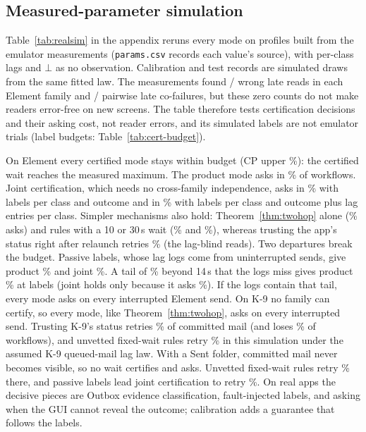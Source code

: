 \subsection{Measured-parameter simulation}
\label{sec:eval-realsim}

Table~\ref{tab:realsim} in the appendix reruns every mode on profiles built from the emulator measurements (\texttt{params.csv} records each value's source), with per-class lags
and $\bot$ as no observation. Calibration and test records are simulated draws from the same fitted law. The measurements found \RsimFitLateWrong/\RsimFitLateObs{} wrong
late reads in each Element family and \RsimFitCoWrong/\RsimFitCoN{} pairwise late co-failures, but these zero counts do not make readers error-free on new screens.
The table therefore tests certification decisions and their asking cost, not reader errors, and its simulated labels are not emulator trials (label budgets: Table~\ref{tab:cert-budget}).

On Element every certified mode stays within budget (CP upper \RsimElemJointPvHi\%): the certified wait reaches the measured maximum. The product mode asks in \RsimElemProdAsk\% of workflows. Joint certification, which needs no cross-family
independence, asks in \RsimElemJointAsk\% with \RsimBaseLabelN{} labels per class and outcome and in \RsimFiveJointAsk\% with \RsimFiveLabelN{} labels per class and outcome plus \CertLagBootN{} lag entries per class. Simpler mechanisms also hold: Theorem~\ref{thm:twohop} alone (\RsimElemGtwoAsk\%
asks) and rules with a 10 or 30\,s wait (\RsimElemRulesAsk\% and \RsimElemRulesThirtyAsk\%), whereas trusting the app's status right after relaunch retries
\RsimElemAppPv\% (the lag-blind reads). Two departures break the budget. Passive labels, whose lag logs come from uninterrupted sends, give product \RsimPassProdPv\% and joint
\RsimPassJointPv\%. A tail of \RsimTail\% beyond 14\,s that the logs miss gives product \RsimTailProdPv\% at \RsimBaseLabelN{} labels (joint holds only because it asks \RsimTailJointAsk\%). If the logs contain that tail, every mode asks on every
interrupted Element send. On K-9 no family can certify, so every mode, like Theorem~\ref{thm:twohop}, asks on every interrupted send. Trusting K-9's status retries
\RsimKnineAppPv\% of committed mail (and loses \RsimKnineAppLoss\% of workflows), and unvetted fixed-wait rules retry \RsimKnineRulesPv\% in this simulation under the assumed K-9 queued-mail lag law. With a Sent folder, committed mail never becomes visible, so no wait certifies and \sys asks. Unvetted fixed-wait rules retry \RsimKsentRulesPv\% there, and passive labels
lead joint certification to retry \RsimKsentPassJointPv\%. On real apps the decisive pieces are Outbox evidence classification, fault-injected labels, and asking when the GUI cannot reveal the outcome; calibration adds a guarantee that follows
the labels.


